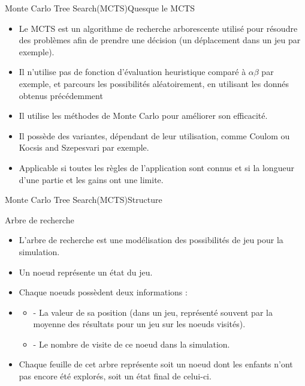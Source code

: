 \begin{frame}{Monte Carlo Tree Search(MCTS)}{Quesque le MCTS}
	\begin{block}{}
		\begin{itemize}
			\item Le MCTS est un algorithme de recherche arborescente utilisé pour résoudre des problèmes afin de prendre une décision (un déplacement dans un jeu par exemple).
			\item Il n'utilise pas de fonction d'évaluation heuristique comparé à $\alpha$$\beta$ par exemple, et parcours les possibilités aléatoirement, en utilisant les donnés obtenus précédemment			\item Il utilise les méthodes de Monte Carlo pour améliorer son efficacité.
			\item Il possède des variantes, dépendant de leur utilisation, comme Coulom ou Kocsis and Szepesvari par exemple.
			\item Applicable si toutes les règles de l'application sont connus et si la longueur d'une partie et les gains ont une limite.	
		\end{itemize}
	\end{block}
\end{frame}

\begin{frame}{Monte Carlo Tree Search(MCTS)}{Structure}
	\begin{block}{Arbre de recherche}
		\begin{itemize}
			\item L'arbre de recherche est une modélisation des possibilités de jeu pour la simulation.
			\item Un noeud représente un état du jeu.
			\item Chaque noeuds possèdent deux informations :
			\item\begin{itemize}
				\item - La valeur de sa position (dans un jeu, représenté souvent par la moyenne des résultats pour un jeu sur les noeuds visités).
				\item - Le nombre de visite de ce noeud dans la simulation.
			\end{itemize}
			\item Chaque feuille de cet arbre représente soit un noeud dont les enfants n'ont pas encore été explorés, soit un état final de celui-ci.		
		\end{itemize}
	\end{block}
\end{frame}

